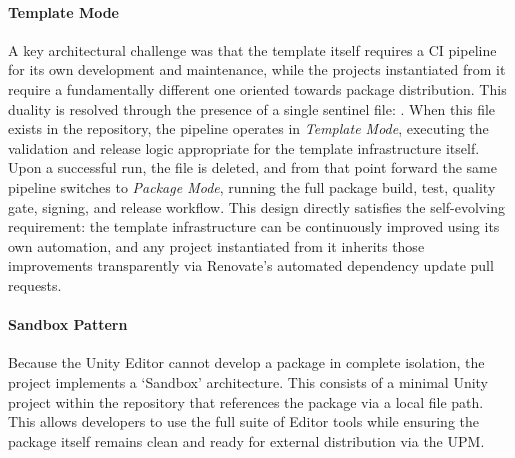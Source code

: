\paragraph{Template Mode}
A key architectural challenge was that the template itself requires a \ac{CI} pipeline for its own development and maintenance, while the projects instantiated from it require a fundamentally different one oriented towards package distribution. This duality is resolved through the presence of a single sentinel file: . When this file exists in the repository, the pipeline operates in \textit{Template Mode}, executing the validation and release logic appropriate for the template infrastructure itself. Upon a successful  run, the file is deleted, and from that point forward the same pipeline switches to \textit{Package Mode}, running the full package build, test, quality gate, signing, and release workflow. This design directly satisfies the self-evolving requirement: the template infrastructure can be continuously improved using its own automation, and any project instantiated from it inherits those improvements transparently via Renovate's automated dependency update pull requests.

\paragraph{Sandbox Pattern}
Because the Unity Editor cannot develop a package in complete isolation, the project implements a `Sandbox' architecture. This consists of a minimal Unity project within the repository that references the package via a local file path. This allows developers to use the full suite of Editor tools while ensuring the package itself remains clean and ready for external distribution via the \ac{UPM}.
